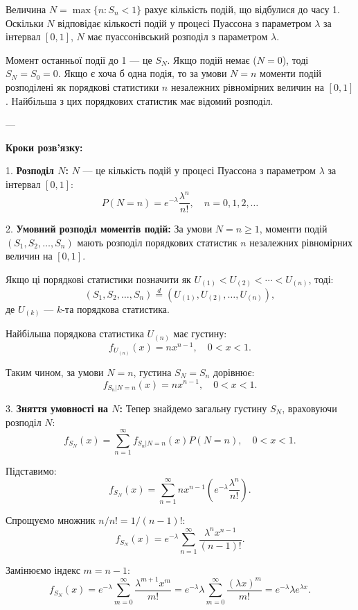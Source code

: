 \documentclass{article}
\begin{document}
Величина \(N = \max\{n : S_n < 1\}\) рахує кількість подій, що відбулися до часу 1. Оскільки \(N\) відповідає кількості подій у процесі Пуассона з параметром \(\lambda\) за інтервал \([0,1]\), \(N\) має пуассонівський розподіл з параметром \(\lambda\).  

Момент останньої події до 1 — це \(S_N\). Якщо подій немає (\(N=0\)), тоді \(S_N = S_0 = 0\). Якщо є хоча б одна подія, то за умови \(N=n\) моменти подій розподілені як порядкові статистики \(n\) незалежних рівномірних величин на \([0,1]\). Найбільша з цих порядкових статистик має відомий розподіл.

---

\textbf{Кроки розв’язку:}

1. \textbf{Розподіл \(N\):}  
   \(N\) — це кількість подій у процесі Пуассона з параметром \(\lambda\) за інтервал \([0,1]\):
   \[
   P(N=n) = e^{-\lambda} \frac{\lambda^n}{n!}, \quad n = 0, 1, 2, \dots
   \]

2. \textbf{Умовний розподіл моментів подій:}  
   За умови \(N=n \geq 1\), моменти подій \((S_1, S_2, \dots, S_n)\) мають розподіл порядкових статистик \(n\) незалежних рівномірних величин на \([0,1]\).  

   Якщо ці порядкові статистики позначити як \(U_{(1)} < U_{(2)} < \cdots < U_{(n)}\), тоді:
   \[
   (S_1, S_2, \dots, S_n) \overset{d}{=} (U_{(1)}, U_{(2)}, \dots, U_{(n)}),
   \]
   де \(U_{(k)}\) — \(k\)-та порядкова статистика.  

   Найбільша порядкова статистика \(U_{(n)}\) має густину:
   \[
   f_{U_{(n)}}(x) = n x^{n-1}, \quad 0 < x < 1.
   \]

   Таким чином, за умови \(N=n\), густина \(S_N = S_n\) дорівнює:
   \[
   f_{S_n|N=n}(x) = n x^{n-1}, \quad 0 < x < 1.
   \]

3. \textbf{Зняття умовності на \(N\):}  
   Тепер знайдемо загальну густину \(S_N\), враховуючи розподіл \(N\):
   \[
   f_{S_N}(x) = \sum_{n=1}^\infty f_{S_n|N=n}(x) P(N=n), \quad 0 < x < 1.
   \]

   Підставимо:
   \[
   f_{S_N}(x) = \sum_{n=1}^\infty n x^{n-1} \left(e^{-\lambda} \frac{\lambda^n}{n!}\right).
   \]

   Спрощуємо множник \(n/n! = 1/(n-1)!\):
   \[
   f_{S_N}(x) = e^{-\lambda} \sum_{n=1}^\infty \frac{\lambda^n x^{n-1}}{(n-1)!}.
   \]

   Замінюємо індекс \(m = n-1\):
   \[
   f_{S_N}(x) = e^{-\lambda} \sum_{m=0}^\infty \frac{\lambda^{m+1} x^m}{m!} = e^{-\lambda} \lambda \sum_{m=0}^\infty \frac{(\lambda x)^m}{m!} = e^{-\lambda} \lambda e^{\lambda x}.
   \]
\end{document}
